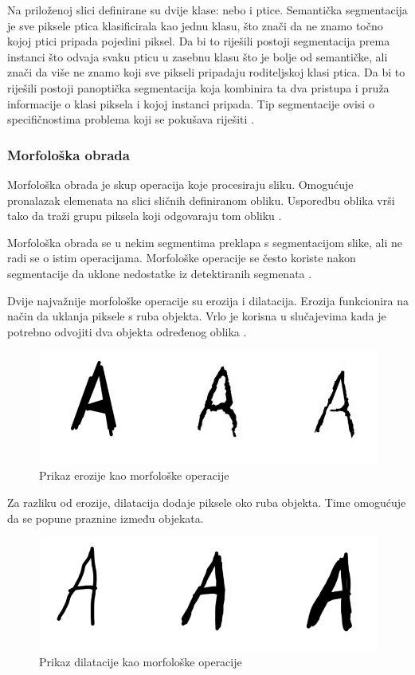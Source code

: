 \documentclass{foi}
\begin{document}
Na priloženoj slici definirane su dvije klase: nebo i ptice. Semantička segmentacija je sve piksele ptica klasificirala kao jednu klasu, što znači da ne znamo točno kojoj ptici pripada pojedini piksel. Da bi to riješili postoji segmentacija prema instanci što odvaja svaku pticu u zasebnu klasu što je bolje od semantičke, ali znači da više ne znamo koji sve pikseli pripadaju roditeljskoj klasi ptica. Da bi to riješili postoji panoptička segmentacija koja kombinira ta dva pristupa i pruža informacije o klasi piksela i kojoj instanci pripada. Tip segmentacije ovisi o specifičnostima problema koji se pokušava riješiti \cite{segmentacija}.


\subsubsection{Morfološka obrada}

Morfološka obrada je skup operacija koje procesiraju sliku. Omogućuje pronalazak elemenata na slici sličnih definiranom obliku. Usporedbu oblika vrši tako da traži grupu piksela koji odgovaraju tom obliku \cite{morph}.

Morfološka obrada se u nekim segmentima preklapa s segmentacijom slike, ali ne radi se o istim operacijama. Morfološke operacije se često koriste nakon segmentacije da uklone nedostatke iz detektiranih segmenata \cite{morph}.

Dvije najvažnije morfološke operacije su erozija i dilatacija.
Erozija funkcionira na način da uklanja piksele s ruba objekta. Vrlo je korisna u slučajevima kada je potrebno odvojiti dva objekta određenog oblika \cite{morph}. 

\begin{figure}[H]
    \centering
    \includegraphics[width=0.75\linewidth]{slike/erosion.png}
    \caption{Prikaz erozije kao morfološke operacije \cite{morph}}
\end{figure}

Za razliku od erozije, dilatacija dodaje piksele oko ruba objekta. Time omogućuje da se popune praznine između objekata.

\begin{figure}[H]
    \centering
    \includegraphics[width=0.75\linewidth]{slike/dilatacija.png}
    \caption{Prikaz dilatacije kao morfološke operacije \cite{morph}}
\end{figure}
\end{document}

